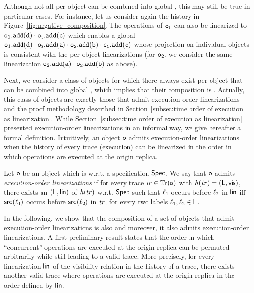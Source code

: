 Although not all per-object  can be combined into global , this may still be true in particular cases. For instance, let us consider again the history in Figure~\ref{fig:negative_composition}. The operations of $\mathtt{o}_1$ can also be linearized to $\aobj_1.\alabelshort[{\tt add}]{d}\cdot \aobj_1.\alabelshort[{\tt add}]{c}$ which enables a global \crdtlinearization{} $\aobj_1.\alabelshort[{\tt add}]{d}\cdot \aobj_2.\alabelshort[{\tt add}]{a}\cdot \aobj_2.\alabelshort[{\tt add}]{b}\cdot \aobj_1.\alabelshort[{\tt add}]{c}$ whose projection on individual objects is consistent with the per-object linearizations (for $\mathtt{o}_2$, we consider the same linearization $\aobj_2.\alabelshort[{\tt add}]{a}\cdot \aobj_2.\alabelshort[{\tt add}]{b}$ as above).

Next, we consider a class of \crdtlinearizable{} objects for which there always exist per-object  that can be combined into global , which implies that their composition is \crdtlinearizable{}. Actually, this class of objects are exactly those that admit execution-order linearizations and the proof methodology described in Section~\ref{subsec:time order of execution as linearization}. While Section~\ref{subsec:time order of execution as linearization} presented execution-order linearizations in an informal way, we give hereafter a formal definition. Intuitively, an object $\mathtt{o}$ admits execution-order linearizations when the history of every trace (execution) can be linearized in the order in which operations are executed at the origin replica.

\begin{definition}
  Let $\mathtt{o}$ be an object which is \crdtlinearizable{} w.r.t. a specification $\mathsf{Spec}$. We say that $\mathtt{o}$ admits \emph{execution-order linearizations} if for every trace $\mathit{tr}\in\mathbb{T}\mathsf{r}(\mathtt{o})$ with $\mathit{h}({\mathit{tr})}=(\mathsf{L},\mathsf{vis})$, there exists an \crdtlinearization{} $(\mathsf{L},\mathsf{lin})$ of $\mathit{h}({\mathit{tr})}$ w.r.t. $\mathsf{Spec}$ such that $\ell_1$ occurs before $\ell_2$ in $\mathsf{lin}$ iff $\mathsf{src}_{}(\ell_1)$ occurs before $\mathsf{src}_{}(\ell_2)$ in $\mathit{tr}$, for every two labels $\ell_1,\ell_2\in\mathsf{L}$.
\end{definition}

In the following, we show that the composition of a set of \crdtlinearizable{} objects that admit execution-order linearizations is also \crdtlinearizable{} and moreover, it also admits execution-order linearizations. A first preliminary result states that the order in which ``concurrent'' operations are executed at the origin replica can be permuted arbitrarily while still leading to a valid trace. More precisely, for every linearization $\mathsf{lin}$ of the visibility relation in the history of a trace, there exists another valid trace where operations are executed at the origin replica in the order defined by $\mathsf{lin}$.

